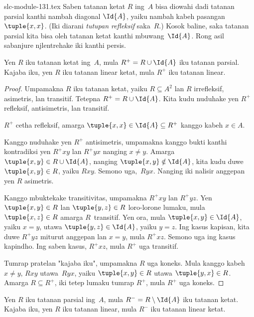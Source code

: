 \begin{filecontents*}[overwrite]{slc-module-131.tex}
Saben tatanan ketat $R$ ing~$A$ bisa diowahi dadi
tatanan parsial kanthi nambah diagonal $\Id{A}$,
yaiku nambah kabeh pasangan~$\tuple{x,x}$.
(Iki diarani \emph{tutupan refleksif} saka~$R$.)
Kosok baline, saka tatanan parsial kita bisa oleh
tatanan ketat kanthi mbuwang~$\Id{A}$.
Rong asil sabanjure njlentrehake iki kanthi persis.

\begin{prop}
Yen $R$ iku tatanan ketat ing~$A$,
mula $R^+ = R \cup \Id{A}$ iku tatanan parsial.
Kajaba iku, yen $R$ iku tatanan linear ketat,
mula $R^+$ iku tatanan linear.
\end{prop}

\begin{proof}
Umpamakna $R$ iku tatanan ketat, yaiku
$R \subseteq A^2$ lan $R$ irrefleksif,
asimetris, lan transitif.
Tetepna $R^+ = R \cup \Id{A}$.
Kita kudu nuduhake yen $R^+$ refleksif,
antisimetris, lan transitif.

$R^+$ cetha refleksif, amarga
$\tuple{x, x} \in \Id{A} \subseteq R^+$
kanggo kabeh $x \in A$.

Kanggo nuduhake yen $R^+$ antisimetris,
umpamakna kanggo bukti kanthi kontradiksi yen
$R^+xy$ lan $R^+yx$ nanging $x \neq y$.
Amarga $\tuple{x,y} \in R \cup \Id{A}$,
nanging $\tuple{x, y} \notin \Id{A}$,
kita kudu duwe $\tuple{x, y} \in R$, yaiku $Rxy$.
Semono uga,~$Ryx$.
Nanging iki nalisir anggepan yen $R$ asimetris.

Kanggo mbuktekake transitivitas, umpamakna
$R^+xy$ lan $R^+yz$.
Yen $\tuple{x, y} \in R$ lan $\tuple{y,z} \in R$
loro-lorone lumaku, mula $\tuple{x, z} \in R$
amarga $R$~transitif.
Yen ora, mula $\tuple{x, y} \in\Id{A}$,
yaiku $x = y$, utawa $\tuple{y, z} \in \Id{A}$,
yaiku $y = z$.
Ing kasus kapisan, kita duwe $R^+yz$ miturut
anggepan lan $x = y$, mula $R^+xz$.
Semono uga ing kasus kapindho.
Ing saben kasus, $R^+xz$, mula $R^+$
uga transitif.

Tumrap pratelan "kajaba iku", umpamakna $R$
uga koneks. Mula kanggo kabeh $x \neq y$,
$Rxy$ utawa~$Ryx$, yaiku
$\tuple{x, y} \in R$ utawa $\tuple{y, x} \in R$.
Amarga $R \subseteq R^+$, iki tetep lumaku
tumrap $R^+$, mula $R^+$ uga koneks.
\end{proof}

\begin{prop}
Yen $R$ iku tatanan parsial ing~$A$,
mula $R^- = R \setminus \Id{A}$ iku tatanan ketat.
Kajaba iku, yen $R$ iku tatanan linear,
mula $R^-$ iku tatanan linear ketat.
\end{prop}


\end{filecontents*}
